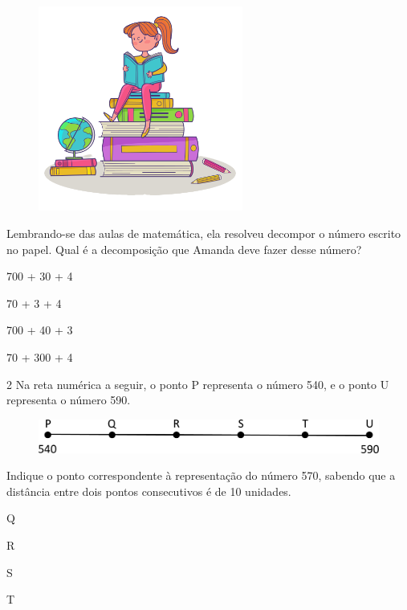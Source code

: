 \begin{figure}[htpb!]
\centering
\includegraphics[width=0.6\textwidth]{./media/image6b.png}
\end{figure}

Lembrando-se das aulas de matemática, ela resolveu decompor o número escrito
no papel. Qual é a decomposição que Amanda deve fazer desse
número?

\begin{escolha}
\item
  700 + 30 + 4
\item
  70 + 3 + 4
\item
  700 + 40 + 3
\item
  70 + 300 + 4
\end{escolha}

\pagebreak

\num{2} Na reta numérica a seguir, o ponto P representa o número 540, e o ponto U representa o número 590.

\begin{figure}[htpb!]
\centering
\includegraphics[width=\textwidth]{./media/image8.png}
\end{figure}

Indique o ponto correspondente à representação do número 570, sabendo que a
distância entre dois pontos consecutivos é de 10 unidades.

\begin{escolha}
  \begin{multicols}{2}
\item
  Q
\item
  R
\item
  S
\item
  T
  \end{multicols}
\end{escolha}

